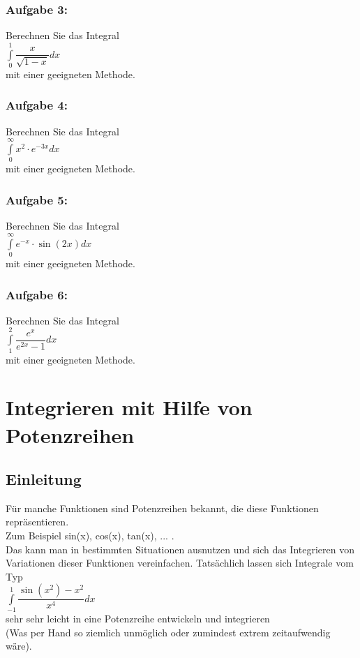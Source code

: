 \documentclass[11pt,final]{scrreprt}
\begin{document}
\subsection*{Aufgabe 3:}
Berechnen Sie das Integral\\
\hspace*{2em} $ \int\limits_0^1 \dfrac{x}{\sqrt{1-x}} dx $\\
mit einer geeigneten Methode.

\subsection*{Aufgabe 4:}
Berechnen Sie das Integral\\
\hspace*{2em} $ \int\limits_0^\infty x^2\cdot e^{-3x} dx $\\
mit einer geeigneten Methode.

\subsection*{Aufgabe 5:}
Berechnen Sie das Integral\\
\hspace*{2em} $ \int\limits_0^\infty  e^{-x}\cdot\sin(2x) dx $\\
mit einer geeigneten Methode.

\subsection*{Aufgabe 6:}
Berechnen Sie das Integral\\
\hspace*{2em} $ \int\limits_1^2 \dfrac{e^x}{e^{2x}-1} dx $\\
mit einer geeigneten Methode.

\chapter{Integrieren mit Hilfe von Potenzreihen}

\section{Einleitung}
Für manche Funktionen sind Potenzreihen bekannt, die diese Funktionen repräsentieren.\\
Zum Beispiel sin(x), cos(x), tan(x), ... .\\
Das kann man in bestimmten Situationen ausnutzen und sich das Integrieren von Variationen dieser Funktionen vereinfachen. Tatsächlich lassen sich Integrale vom Typ \\
\hspace*{3em}$\int\limits_{-1}^1 \dfrac{\sin(x^2)-x^2}{x^4} dx $ \\
sehr sehr leicht in eine Potenzreihe entwickeln und integrieren\\
(Was per Hand so ziemlich unmöglich oder zumindest extrem zeitaufwendig wäre).\\
\end{document}
